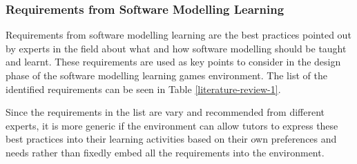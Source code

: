 \documentclass[12pt, a4paper]{report} \usepackage[titletoc]{appendix}
\begin{document}
\subsubsection{Requirements from Software Modelling Learning}
\label{Requirements from Software Modelling Learning}
Requirements from software modelling learning are the best practices pointed out by experts in the field about what and how software modelling should be taught and learnt. These requirements are used as key points to consider in the design phase of the software modelling learning games environment. The list of the identified requirements can be seen in Table \ref{literature-review-1}. 

Since the requirements in the list are vary and recommended from different experts, it is more generic if the environment can allow tutors to express these best practices into their learning activities based on their own preferences and needs rather than fixedly embed all the requirements into the environment.
\end{document}
